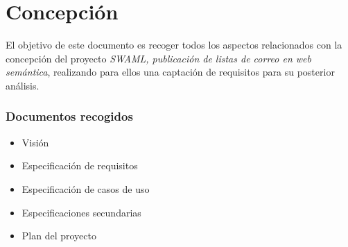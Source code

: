 
\section{Concepción}

El objetivo de este documento es recoger todos los aspectos relacionados
con la concepción del proyecto 
\emph{SWAML, publicación de listas de correo en web semántica}, realizando
para ellos una captación de requisitos para su posterior análisis.

\subsubsection{Documentos recogidos}

\begin{itemize}
 \item Visión
 \item Especificación de requisitos
 \item Especificación de casos de uso
 \item Especificaciones secundarias
 \item Plan del proyecto
\end{itemize}











